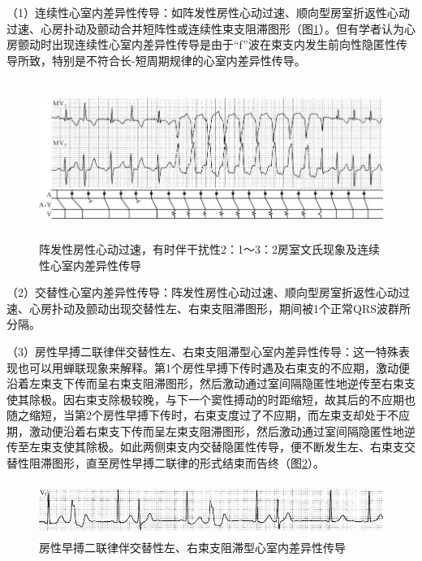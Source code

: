 （1）连续性心室内差异性传导：如阵发性房性心动过速、顺向型房室折返性心动过速、心房扑动及颤动合并短阵性或连续性束支阻滞图形（图\ref{fig35-4}）。但有学者认为心房颤动时出现连续性心室内差异性传导是由于“f”波在束支内发生前向性隐匿性传导所致，特别是不符合长-短周期规律的心室内差异性传导。

\begin{figure}[!htbp]
 \centering
 \includegraphics[width=5.80208in,height=2.02083in]{./images/Image00557.jpg}
 \captionsetup{justification=centering}
 \caption{阵发性房性心动过速，有时伴干扰性2：1～3：2房室文氏现象及连续性心室内差异性传导}
 \label{fig35-4}
  \end{figure} 

（2）交替性心室内差异性传导：阵发性房性心动过速、顺向型房室折返性心动过速、心房扑动及颤动出现交替性左、右束支阻滞图形，期间被1个正常QRS波群所分隔。

（3）房性早搏二联律伴交替性左、右束支阻滞型心室内差异性传导：这一特殊表现也可以用蝉联现象来解释。第1个房性早搏下传时遇及右束支的不应期，激动便沿着左束支下传而呈右束支阻滞图形，然后激动通过室间隔隐匿性地逆传至右束支使其除极。因右束支除极较晚，与下一个窦性搏动的时距缩短，故其后的不应期也随之缩短，当第2个房性早搏下传时，右束支度过了不应期，而左束支却处于不应期，激动便沿着右束支下传而呈左束支阻滞图形，然后激动通过室间隔隐匿性地逆传至左束支使其除极。如此两侧束支内交替隐匿性传导，便不断发生左、右束支交替性阻滞图形，直至房性早搏二联律的形式结束而告终（图\ref{fig35-5}）。

\begin{figure}[!htbp]
 \centering
 \includegraphics[width=5.58333in,height=0.6875in]{./images/Image00558.jpg}
 \captionsetup{justification=centering}
 \caption{房性早搏二联律伴交替性左、右束支阻滞型心室内差异性传导}
 \label{fig35-5}
  \end{figure} 


